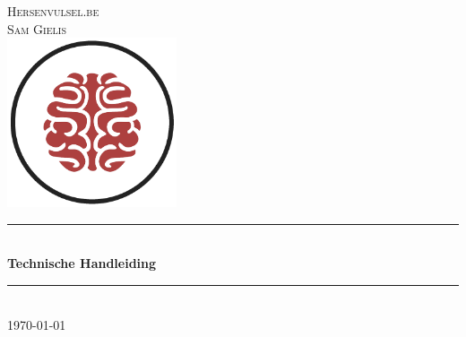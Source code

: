 \documentclass[12pt]{article}
\begin{document}

\begin{titlepage}

\newcommand{\HRule}{\rule{\linewidth}{0.5mm}} %

\center %

\textsc{\Large Hersenvulsel.be}\\[0.5cm] %
\textsc{\large Sam Gielis}\\[1cm] %
\includegraphics[width=50mm,scale=0.5]{logo.png}\\[1cm]

\HRule \\[1cm]
{ \huge \bfseries Technische Handleiding}\\[0.8cm] %
\HRule \\[3cm]


{\large \today}\\[3cm] %
\vfill %

\end{titlepage}


\tableofcontents %
\newpage %

\end{document}
